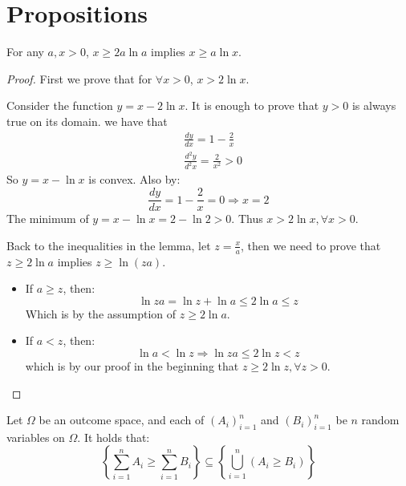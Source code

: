 \section{Propositions}
\begin{lemma}
    \label{lemma:x-lnx}
    For any $a, x > 0$, $x \geq 2a\ln{a}$ implies $x \geq a\ln{x}$.
\end{lemma}
%
\begin{proof}
First we prove that for $\forall x > 0$, $x > 2\ln{x}$.

Consider the function $y = x - 2\ln{x}$. It is enough to prove that $y > 0$ is always true on its domain. we have that
%
\begin{align*}
    & \frac{dy}{dx} = 1 - \frac{2}{x}\\
    & \frac{d^2y}{d^2x} = \frac{2}{x^2} > 0
\end{align*}
%
So $y = x - \ln{x}$ is convex. Also by:
%
\begin{equation*}
    \frac{dy}{dx} = 1 - \frac{2}{x} = 0 \Rightarrow x = 2
\end{equation*}
%
The minimum of $y = x - \ln{x} = 2 - \ln{2} > 0$. Thus $x > 2\ln{x}, \forall x > 0$.

Back to the inequalities in the lemma, let $z = \frac xa$, then we need to prove that $z \geq 2\ln{a}$ implies $z \geq \ln{(za)}$.
%
\begin{itemize}
    \item If $a \geq z$, then:
    \begin{equation*}
        \ln{za} = \ln{z} + \ln{a} \leq 2 \ln{a} \leq z
    \end{equation*}
    Which is by the assumption of $z \geq 2\ln{a}$.
    \item  If $a < z$, then:
    \begin{equation*}
        \ln{a} < \ln{z} \Rightarrow \ln{za} \leq 2\ln{z} < z
    \end{equation*}
    which is by our proof in the beginning that $z \geq 2\ln{z}, \forall z > 0$. \qedhere
\end{itemize}
\end{proof}
%
\begin{lemma}
    \label{lemma:summation}
        Let $\Omega$ be an outcome space, and each of $(A_i)^n_{i = 1}$ and $(B_i)^n_{i = 1}$ be $n$ random variables on $\Omega$. It holds that:
        \begin{equation*}
            \left\{\sum_{i=1}^{n}A_i \geq \sum_{i=1}^{n}B_i \right\} \subseteq \left\{\bigcup^n_{i = 1}(A_i \geq B_i)\right\}
        \end{equation*}
    \end{lemma}
